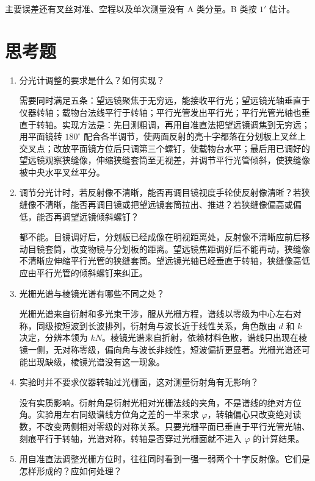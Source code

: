 \documentclass{../template/myrpt}
\begin{document}
主要误差还有叉丝对准、空程以及单次测量没有 A 类分量。B 类按 $1'$ 估计。

\iffalse
\section{思考题}

\begin{enumerate}[label=\arabic*. ]
  \item 分光计调整的要求是什么？如何实现？

  需要同时满足五条：望远镜聚焦于无穷远，能接收平行光；望远镜光轴垂直于仪器转轴；载物台法线平行于转轴；平行光管发出平行光；平行光管光轴也垂直于转轴。实现方法是：先目测粗调，再用自准直法把望远镜调焦到无穷远；用平面镜转 $180^\circ$ 配合各半调节，使两面反射的亮十字都落在分划板上叉丝上交叉点；改放平面镜方位后只调第三个螺钉，使载物台水平；最后用已调好的望远镜观察狭缝像，伸缩狭缝套筒至无视差，并调节平行光管倾斜，使狭缝像被中央水平叉丝平分。

  \item 调节分光计时，若反射像不清晰，能否再调目镜视度手轮使反射像清晰？若狭缝像不清晰，能否再调目镜或把望远镜套筒拉出、推进？若狭缝像偏高或偏低，能否再调望远镜倾斜螺钉？

  都不能。目镜调好后，分划板已经成像在明视距离处，反射像不清晰应前后移动目镜套筒，改变物镜与分划板的距离。望远镜焦距调好后不能再动，狭缝像不清晰应伸缩平行光管的狭缝套筒。望远镜光轴已经垂直于转轴，狭缝像高低应由平行光管的倾斜螺钉来纠正。

  \item 光栅光谱与棱镜光谱有哪些不同之处？

  光栅光谱来自衍射和多光束干涉，服从光栅方程，谱线以零级为中心左右对称，同级按短波到长波排列，衍射角与波长近于线性关系，角色散由 $d$ 和 $k$ 决定，分辨本领为 $kN$。棱镜光谱来自折射，依赖材料色散，谱线只出现在棱镜一侧，无对称零级，偏向角与波长非线性，短波偏折更显著。光栅光谱还可能出现缺级，棱镜光谱没有这一现象。

  \item 实验时并不要求仪器转轴过光栅面，这对测量衍射角有无影响？

  没有实质影响。衍射角是衍射光相对光栅法线的夹角，不是谱线的绝对方位角。实验用左右同级谱线方位角之差的一半来求 $\varphi$，转轴偏心只改变绝对读数，不改变两侧相对零级的对称关系。只要光栅平面已垂直于平行光管光轴、刻痕平行于转轴，光谱对称，转轴是否穿过光栅面就不进入 $\varphi$ 的计算结果。

  \item 用自准直法调整光栅方位时，往往同时看到一强一弱两个十字反射像。它们是怎样形成的？应如何处理？


\end{enumerate}
\end{document}
